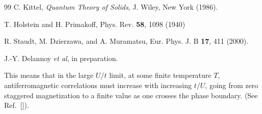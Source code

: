 \documentclass[aps,prb,twocolumn,superscriptaddress,
               amsmath]{revtex4}
\renewcommand{\=}{\,=\,}
\newcommand{\+}{\,+\,}
\renewcommand{\-}{\,-\,}
\begin{document}
\begin{thebibliography}{99}
C. Kittel, {\it Quantum Theory of Solids},
J. Wiley, New York (1986).

T. Holstein and  H. Primakoff, Phys. Rev. {\bf 58}, 1098 (1940)

R. Staudt, M. Dzierzawa, and A. Muramatsu,
Eur. Phys. J. B {\bf 17}, 411 (2000).

 J.-Y. Delannoy {\it et al}, in preparation.


 This means that in the large
$U/t$ limit, at some finite temperature $T$,
antiferromagnetic correlations must increase with increasing $t/U$, going from
zero staggered magnetization to a finite value as one crosses the phase
boundary.
(See Ref.~[]).



\end{thebibliography}
\end{document}

